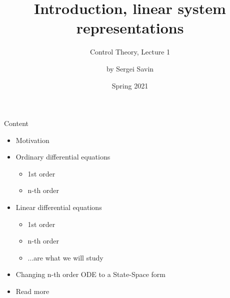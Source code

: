 \documentclass{beamer}
\title{Introduction, linear system representations}
\subtitle{Control Theory, Lecture 1}
\author{by Sergei Savin}
\date{Spring 2021}
\begin{document}
\maketitle


\begin{frame}{Content}

\begin{itemize}
\item Motivation
\item Ordinary differential equations
    \begin{itemize}
    \item 1st order
    \item n-th order
    \end{itemize}
\item Linear differential equations
    \begin{itemize}
    \item 1st order
    \item n-th order
    \item ...are what we will study
    \end{itemize}
\item Changing n-th order ODE to a State-Space form
\item Read more
\end{itemize}

\end{frame}
\end{document}
